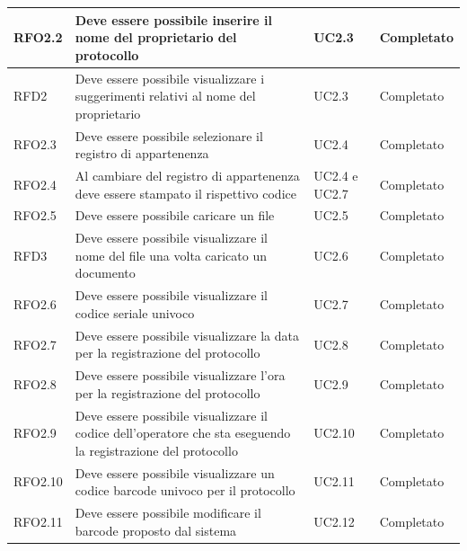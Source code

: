 \begin{longtable}{| p{3cm} | p{6cm} | p{3cm} | p{3cm} |}
        RFO2.2 & Deve essere possibile inserire il nome del proprietario del protocollo & UC2.3 & Completato
        \\ \hline
        
        RFD2 & Deve essere possibile visualizzare i suggerimenti relativi al nome del proprietario & UC2.3 & Completato
        \\ \hline
        
        RFO2.3 & Deve essere possibile selezionare il registro di appartenenza & UC2.4 & Completato
        \\ \hline
        
        RFO2.4 & Al cambiare del registro di appartenenza deve essere stampato il rispettivo codice & UC2.4 e UC2.7 & Completato
        \\ \hline
        
        RFO2.5 & Deve essere possibile caricare un file & UC2.5 & Completato
        \\ \hline
        
        RFD3 & Deve essere possibile visualizzare il nome del file una volta caricato un documento & UC2.6 & Completato
        \\ \hline
        
        RFO2.6 & Deve essere possibile visualizzare il codice seriale univoco & UC2.7 & Completato
        \\ \hline
        
        RFO2.7 & Deve essere possibile visualizzare la data per la registrazione del protocollo & UC2.8 & Completato
        \\ \hline
        
        RFO2.8 & Deve essere possibile visualizzare l'ora per la registrazione del protocollo & UC2.9 & Completato
        \\ \hline
        
        RFO2.9 & Deve essere possibile visualizzare il codice dell'operatore che sta eseguendo la registrazione del protocollo & UC2.10 & Completato
        \\ \hline
        
        RFO2.10 & Deve essere possibile visualizzare un codice barcode univoco per il protocollo & UC2.11 & Completato
        \\ \hline
        
        RFO2.11 & Deve essere possibile modificare il barcode proposto dal sistema & UC2.12 & Completato
        \\ \hline
        

\end{longtable}
